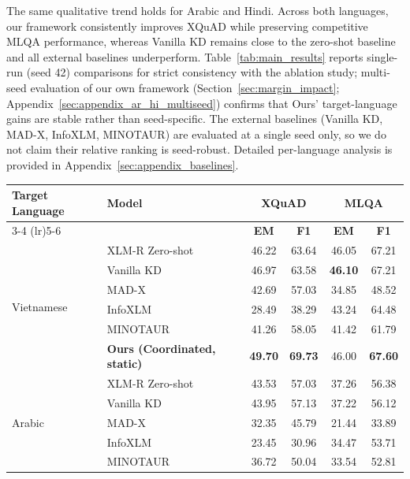\documentclass[11pt]{article}
\begin{document}
The same qualitative trend holds for Arabic and Hindi. Across both languages, our framework consistently improves XQuAD while preserving competitive MLQA performance, whereas Vanilla KD remains close to the zero-shot baseline and all external baselines underperform. Table~\ref{tab:main_results} reports single-run (seed 42) comparisons for strict consistency with the ablation study; multi-seed evaluation of our own framework (Section~\ref{sec:margin_impact}; Appendix~\ref{sec:appendix_ar_hi_multiseed}) confirms that Ours' target-language gains are stable rather than seed-specific. The external baselines (Vanilla KD, MAD-X, InfoXLM, MINOTAUR) are evaluated at a single seed only, so we do not claim their relative ranking is seed-robust. Detailed per-language analysis is provided in Appendix~\ref{sec:appendix_baselines}.
\begin{table}[t]
\centering
\begin{tabular}{llcccc}
\toprule
\multirow{2}{*}{\textbf{Target Language}} & \multirow{2}{*}{\textbf{Model}} & \multicolumn{2}{c}{\textbf{XQuAD}} & \multicolumn{2}{c}{\textbf{MLQA}} \\
\cmidrule(lr){3-4} \cmidrule(lr){5-6}
 & & \textbf{EM} & \textbf{F1} & \textbf{EM} & \textbf{F1} \\
\midrule
\multirow{6}{*}{Vietnamese}
 & XLM-R Zero-shot & 46.22 & 63.64 & 46.05 & 67.21 \\
 & Vanilla KD \citep{hinton2015distillingknowledgeneuralnetwork} & 46.97 & 63.58 & \textbf{46.10} & 67.21 \\
 & MAD-X \citep{pfeiffer-etal-2020-mad} & 42.69 & 57.03 & 34.85 & 48.52 \\
 & InfoXLM \citep{chi-etal-2021-infoxlm} & 28.49 & 38.29 & 43.24 & 64.48 \\
 & MINOTAUR \citep{sherborne-etal-2023-optimal} & 41.26 & 58.05 & 41.42 & 61.79 \\
 & \textbf{Ours (Coordinated, static)} & \textbf{49.70} & \textbf{69.73} & 46.00 & \textbf{67.60} \\
\midrule
\multirow{6}{*}{Arabic}
 & XLM-R Zero-shot & 43.53 & 57.03 & 37.26 & 56.38 \\
 & Vanilla KD \citep{hinton2015distillingknowledgeneuralnetwork} & 43.95 & 57.13 & 37.22 & 56.12 \\
 & MAD-X \citep{pfeiffer-etal-2020-mad} & 32.35 & 45.79 & 21.44 & 33.89 \\
 & InfoXLM \citep{chi-etal-2021-infoxlm} & 23.45 & 30.96 & 34.47 & 53.71 \\
 & MINOTAUR \citep{sherborne-etal-2023-optimal} & 36.72 & 50.04 & 33.54 & 52.81 \\

\end{tabular}
\end{table}
\end{document}
